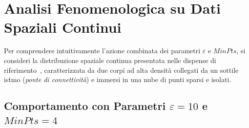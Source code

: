\FloatBarrier
\section{Analisi Fenomenologica su Dati Spaziali Continui}
\label{sec:dm-dbscan-spatial-analysis}

Per comprendere intuitivamente l'azione combinata dei parametri $\varepsilon$ e $MinPts$, si consideri la distribuzione spaziale continua presentata nelle dispense di riferimento~\cite{tan2018}, caratterizzata da due corpi ad alta densità collegati da un sottile istmo (\textit{ponte di connettività}) e immersi in una nube di punti sparsi e isolati.

\FloatBarrier
\subsection{Comportamento con Parametri \texorpdfstring{$\varepsilon = 10$ e $MinPts = 4$}{Eps = 10 e MinPts = 4}}

